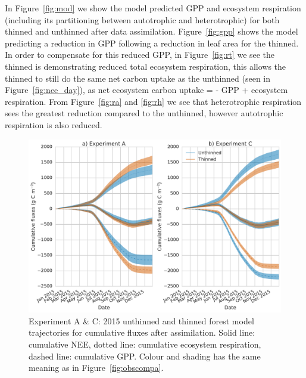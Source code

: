 \documentclass[draft,linenumbers]{agujournal}
\begin{document}
In Figure~\ref{fig:mod} we show the model predicted GPP and ecosystem respiration (including its partitioning between autotrophic and heterotrophic) for both thinned and unthinned after data assimilation. Figure~\ref{fig:gpp} shows the model predicting a reduction in GPP following a reduction in leaf area for the thinned. In order to compensate for this reduced GPP, in Figure~\ref{fig:rt} we see the thinned is demonstrating reduced total ecosystem respiration, this allows the thinned to still do the same net carbon uptake as the unthinned (seen in Figure~\ref{fig:nee_day}), as net ecosystem carbon uptake = - GPP + ecosystem respiration. From Figure~\ref{fig:ra} and \ref{fig:rh} we see that heterotrophic respiration sees the greatest reduction compared to the unthinned, however autotrophic respiration is also reduced. 




\begin{figure}[ht]
    \centering
        \includegraphics[width=\textwidth]{flux_part.pdf}
    \caption{Experiment A \& C: 2015 unthinned and thinned forest model trajectories for cumulative fluxes after assimilation. Solid line: cumulative NEE, dotted line: cumulative ecosystem respiration, dashed line: cumulative GPP. Colour and shading has the same meaning as in Figure~\ref{fig:obscompa}.} \label{fig:cum_flux}
\end{figure}
\end{document}
